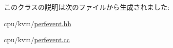 このクラスの説明は次のファイルから生成されました:\begin{DoxyCompactItemize}
\item 
cpu/kvm/\hyperlink{perfevent_8hh}{perfevent.hh}\item 
cpu/kvm/\hyperlink{perfevent_8cc}{perfevent.cc}\end{DoxyCompactItemize}
